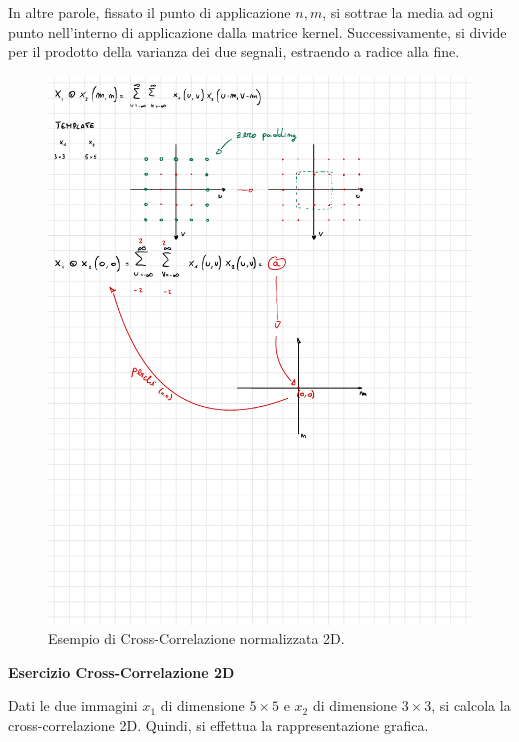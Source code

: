\documentclass[a4paper]{article}
\begin{document}
	\noindent
	In altre parole, fissato il punto di applicazione $n, m$, si sottrae la media ad ogni punto nell'interno di applicazione dalla matrice kernel. Successivamente, si divide per il prodotto della varianza dei due segnali, estraendo a radice alla fine.
	
	\begin{figure}[!htp]
		\centering
		\includegraphics[width=1\textwidth]{img/ex_exam/eg_cross-correlazione-2D.pdf}
		\caption{Esempio di Cross-Correlazione normalizzata 2D.}
	\end{figure}

	\newpage
	
	\noindent
	\textcolor{Red3}{\textbf{Esercizio Cross-Correlazione 2D}}\newline
	
	\noindent
	Dati le due immagini $x_{1}$ di dimensione $5 \times 5$ e $x_{2}$ di dimensione $3 \times 3$, si calcola la cross-correlazione 2D. Quindi, si effettua la rappresentazione grafica.
	
\end{document}
